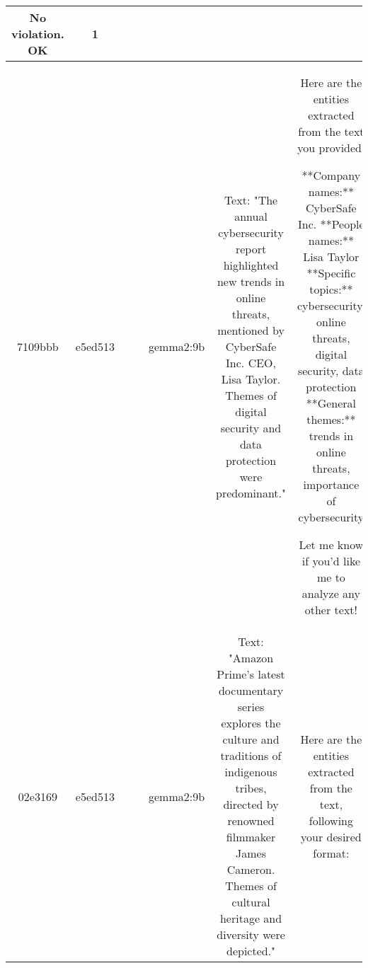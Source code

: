 \begin{table}[h!]
\begin{tabular}{|c|c|c|c|c|c|c|c|c|c|}
No violation.
OK & 1\\
\hline
7109bbb & e5ed513 &  &  & gemma2:9b & Text: "The annual cybersecurity report highlighted new trends in online threats, mentioned by CyberSafe Inc. CEO, Lisa Taylor. Themes of digital security and data protection were predominant." & Here are the entities extracted from the text you provided:

**Company names:** CyberSafe Inc. 
**People names:** Lisa Taylor
**Specific topics:** cybersecurity,  online threats, digital security, data protection 
**General themes:**  trends in online threats, importance of cybersecurity


Let me know if you'd like me to analyze any other text! 
 & err & The chatbot's output needs to be evaluated based on the format specified in the description.

1. **Order and Format**: 
   - The description specifies an order: first company names, then people names, then specific topics, and finally, general themes. The output follows this specified order.
   - The description specifies that the lists should be comma-separated. However, the lists given by the chatbot are not consistently comma-separated.
   - "Company names" and "People names" appear to have single items, whereas "Specific topics" and "General themes" are listed as multiple entries. Therefore, for consistency with the format when there are multiple entries, comma separation should be used for all lists.

2. **Use of format indicators (e.g., <comma_separated_list_of_company_names>)**:
   - The description suggests placeholders to indicate lists but does not explicitly require these placeholders in the final output. Thus, their absence is not a compliance issue as long as the order and separation are clear, and comma separation is considered a typical expectation for lists.

Given these considerations, I conclude that the output does not fully comply due to the lack of comma separation for single-entry lists, and that should have been applied consistently.

Mention the reason for violation and your thinking went into coming up with it.
ERR & 1\\
\hline
02e3169 & e5ed513 &  &  & gemma2:9b & Text: "Amazon Prime's latest documentary series explores the culture and traditions of indigenous tribes, directed by renowned filmmaker James Cameron. Themes of cultural heritage and diversity were depicted." & Here are the entities extracted from the text, following your desired format:


\end{tabular}
\end{table}
